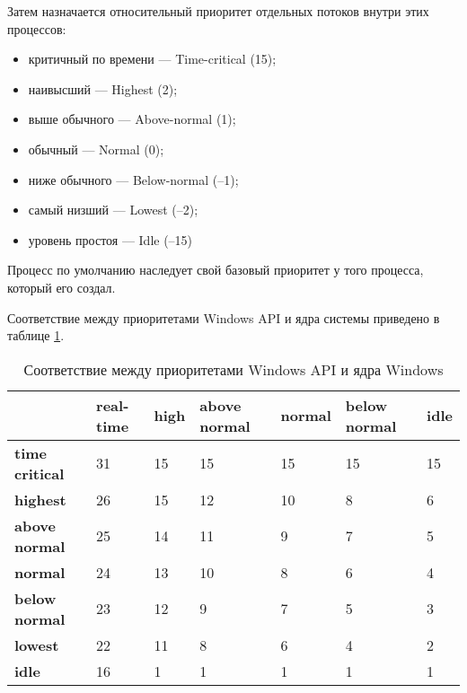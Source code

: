 Затем назначается относительный приоритет отдельных потоков внутри этих
процессов:
\begin{itemize}[left=\parindent]
    \item критичный по времени — Time-critical (15);
    \item наивысший — Highest (2);
    \item выше обычного — Above-normal (1);
    \item обычный — Normal (0);
    \item ниже обычного — Below-normal (–1);
    \item самый низший — Lowest (–2);
    \item уровень простоя — Idle (–15)
\end{itemize}

Процесс по умолчанию наследует свой базовый приоритет у того процесса, который
его создал.

Соответствие между приоритетами Windows API и ядра системы приведено в таблице
\ref{tab:priority}.

\begin{table}[h]
    \caption{Соответствие между приоритетами Windows API и ядра Windows}
    \begin{center}
        \begin{tabular}{|l|p{45pt}|p{45pt}|p{45pt}|p{45pt}|p{45pt}|p{45pt}|}
            \hline
            {} & \textbf{real-time} & \textbf{high} & \textbf{above normal} &
            \textbf{normal} & \textbf{below normal} & \textbf{idle}\\
            \hline
            \textbf{time critical} & 31 & 15 & 15 & 15 & 15 & 15 \\
            \hline
            \textbf{highest} & 26 & 15 & 12 & 10 & 8 & 6 \\
            \hline
            \textbf{above normal} & 25 & 14 & 11 & 9 & 7 & 5 \\
            \hline
            \textbf{normal} & 24 & 13 & 10 & 8 & 6 & 4 \\
            \hline
            \textbf{below normal} & 23 & 12 & 9 & 7 & 5 & 3 \\
            \hline
            \textbf{lowest} & 22 & 11 & 8 & 6 & 4 & 2 \\
            \hline
            \textbf{idle} & 16 & 1 & 1 & 1 & 1 & 1 \\
            \hline
        \end{tabular}
    \end{center}
    \label{tab:priority}
\end{table}

